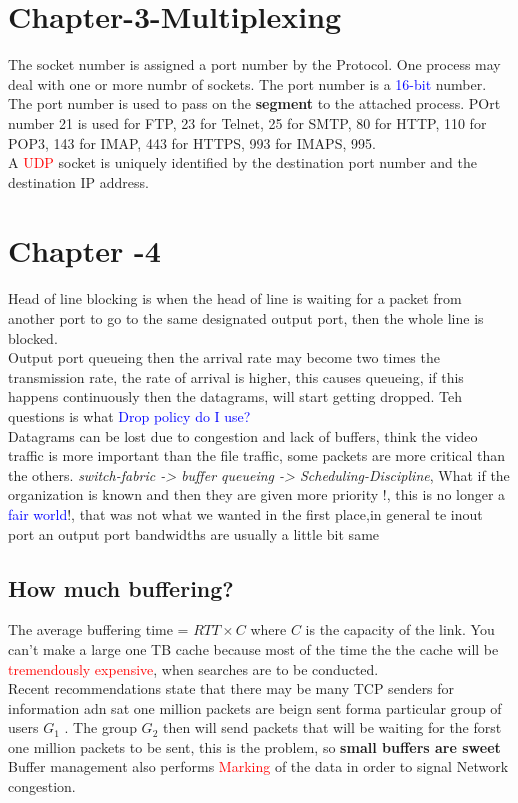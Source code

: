 \section{Chapter-3-Multiplexing}
The socket number is assigned a port number by the Protocol. One process may deal with one or more numbr of sockets. The 
port number is a \textcolor{blue}{16-bit} number. The port number is used to pass on the \textbf{segment} to the attached process.
POrt number 21 is used for FTP, 23 for Telnet, 25 for SMTP, 80 for HTTP, 110 for POP3, 143 for IMAP, 443 for HTTPS, 993 for IMAPS, 995.
\\
A \textcolor{red}{UDP}  socket is uniquely identified by the destination port number and the destination IP address.

\section{Chapter -4}
Head of line blocking is when the head of line is waiting for a packet from another port to go to the same designated output port,
then the whole line is blocked.
\\
Output port queueing then the arrival rate may become two times the transmission rate, the rate of arrival is higher, this causes queueing, 
if this happens continuously then the datagrams, will start getting dropped. Teh questions is what \textcolor{blue}{Drop policy do I use?}
\\
Datagrams can be lost due to congestion and lack of buffers, think the video traffic is more important than the file traffic, some packets are more
critical than the others.
\textit{switch-fabric -> buffer queueing -> Scheduling-Discipline}, What if the organization is known and then they are given more priority !, this is 
no longer a \textcolor{blue}{fair world}!, that was not what we wanted in the first place,in general te inout port an output port bandwidths are usually a little bit same
\subsection{How much buffering?}
The average buffering time = $RTT \times C$ where $C$ is the capacity of the link. You can't make a large one TB cache because most of the time
the the cache will be \textcolor{red}{tremendously expensive}, when searches are to be conducted.
\\
Recent recommendations state that there may be many TCP senders for information adn sat one million packets are beign sent forma particular group of users
$G_1$ . The group $G_2$ then will send packets that will be waiting for the forst one million packets to be sent, this is the problem,
so \textbf{small buffers are sweet}
\\ Buffer management also performs \textcolor{red}{Marking} of the data in order to signal Network congestion.


